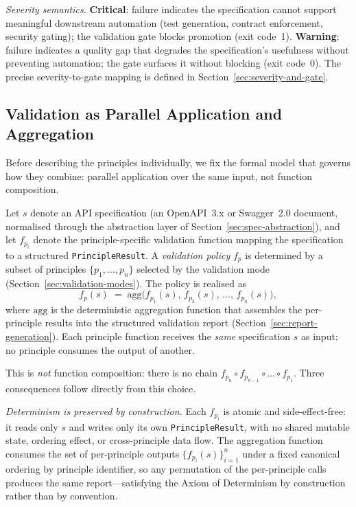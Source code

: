 \textit{Severity semantics.} \textbf{Critical}: failure indicates the specification cannot support meaningful downstream automation (test generation, contract enforcement, security gating); the validation gate blocks promotion (exit code~1). \textbf{Warning}: failure indicates a quality gap that degrades the specification's usefulness without preventing automation; the gate surfaces it without blocking (exit code~0). The precise severity-to-gate mapping is defined in Section~\ref{sec:severity-and-gate}.

\subsection{Validation as Parallel Application and Aggregation}
\label{subsec:fp-formalism}

Before describing the principles individually, we fix the formal model that governs how they combine: parallel application over the same input, not function composition.

Let $s$ denote an API specification (an OpenAPI~3.x or Swagger~2.0 document, normalised through the abstraction layer of Section~\ref{sec:spec-abstraction}), and let $f_{p_i}$ denote the principle-specific validation function mapping the specification to a structured \texttt{PrincipleResult}. A \textit{validation policy} $f_p$ is determined by a subset of principles $\{p_1, \dots, p_n\}$ selected by the validation mode (Section~\ref{sec:validation-modes}). The policy is realised as
\[
  f_p(s) \;=\; \mathrm{agg}\bigl(f_{p_1}(s),\, f_{p_2}(s),\, \dots,\, f_{p_n}(s)\bigr),
\]
where $\mathrm{agg}$ is the deterministic aggregation function that assembles the per-principle results into the structured validation report (Section~\ref{sec:report-generation}). Each principle function receives the \emph{same} specification $s$ as input; no principle consumes the output of another.

This is \textit{not} function composition: there is no chain $f_{p_n} \circ f_{p_{n-1}} \circ \dots \circ f_{p_1}$. Three consequences follow directly from this choice.

\textit{Determinism is preserved by construction.} Each $f_{p_i}$ is atomic and side-effect-free: it reads only $s$ and writes only its own \texttt{PrincipleResult}, with no shared mutable state, ordering effect, or cross-principle data flow. The aggregation function consumes the set of per-principle outputs $\{f_{p_i}(s)\}_{i=1}^{n}$ under a fixed canonical ordering by principle identifier, so any permutation of the per-principle calls produces the same report---satisfying the Axiom of Determinism by construction rather than by convention.

